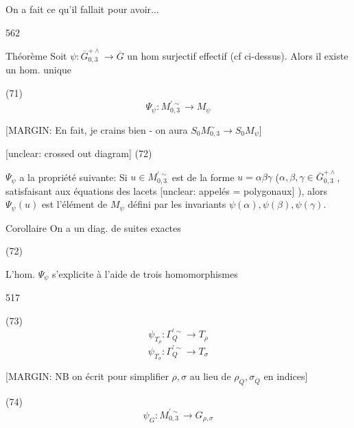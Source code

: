 \begin{enumerate}
On a fait ce qu'il fallait pour avoir...

\newpage


562

Théorème Soit $\psi : \overline{G}_{0,3}^{+ \wedge} \to \overline{G}$ un
hom surjectif effectif (cf ci-dessus).
Alors il existe un hom. unique

(71) $$ \Psi_\psi : M_{0,3}^{\prime \sim} \to M_\psi $$

[MARGIN: En fait, je crains bien - on aura $S_0 M_{0,3}^\sim \to S_0 M_\psi$]

[unclear: crossed out diagram]
(72)

$\Psi_\psi$ a la propriété suivante: Si 
$u \in M_{0,3}^{\prime \sim}$ est de la forme $u = \alpha \beta \gamma$
($\alpha, \beta, \gamma \in \overline{G}_{0,3}^{+ \wedge}$, satisfaisant aux équations
des lacets [unclear: appelés = polygonaux] ), alors
$\Psi_\psi(u)$ est l'élément de $M_\psi$
défini par les invariants $\psi(\alpha), \psi(\beta), \psi(\gamma)$.

Corollaire On a un diag. de suites exactes

(72)

L'hom. $\Psi_\psi$ s'explicite à l'aide
de trois homomorphismes

517

\newpage


(73)
$$ \psi_{T_\rho} : \Gamma_Q^{\prime \sim} \to T_\rho $$
$$ \psi_{T_\sigma} : \Gamma_Q^{\prime \sim} \to T_\sigma $$

[MARGIN: NB on écrit pour simplifier $\rho, \sigma$ au lieu de $\rho_{\overline{Q}}, \sigma_{\overline{Q}}$ en indices]

(74)
$$ \psi_G : M_{0,3}^{\prime \sim} \to G_{\rho,\sigma} $$


\end{enumerate}
